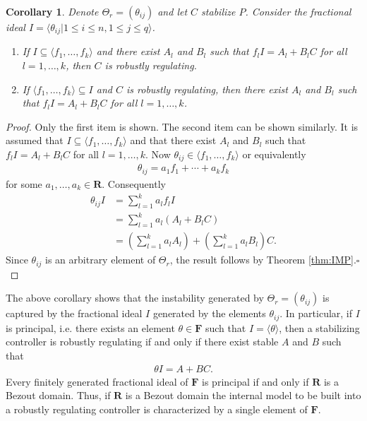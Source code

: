 \documentclass[11pt, a4paper]{amsart}
\newtheorem{corollary}[theorem]{Corollary}
\newcommand{\Plant}{P}										%
\newcommand{\Cont}{C}										%
\newcommand{\Gen}{\Theta}									%
\newcommand{\gen}{\theta}									%
\newcommand{\stable}{\mathbf{R}}							%
\newcommand{\fractions}[1]{\mathbf{F}} %
\begin{document}
\begin{corollary}\label{cor:IMP2}
Denote $\Gen_r=(\gen_{ij})$ and let $\Cont$ stabilize $\Plant$. Consider the fractional ideal $I=\langle \gen_{ij} | 1\leq i\leq n, 1\leq j\leq q\rangle$.
\begin{enumerate}
\item If $I\subseteq \langle f_1,\ldots,f_k\rangle$ and there exist $A_l$ and $B_l$ such that $f_l I=A_l+B_l \Cont$ for all $l=1,\ldots, k$, then $\Cont$ is robustly regulating. 
\item If $\langle f_1,\ldots,f_k\rangle\subseteq I$ and $\Cont$ is robustly regulating, then there exist $A_l$ and $B_l$ such that $f_l I=A_l+B_l \Cont$ for all $l=1,\ldots, k$.
\end{enumerate}
\end{corollary}
\begin{proof}
Only the first item is shown. The second item can be shown similarly. It is assumed that $I\subseteq \langle f_1,\ldots,f_k\rangle$ and that there exist $A_l$ and $B_l$ such that $f_l I=A_l+B_l \Cont$ for all $l=1,\ldots, k$. Now $\gen_{ij}\in \langle f_1,\ldots,f_k\rangle$ or equivalently
\begin{align*}
\gen_{ij}=a_1 f_1+\cdots +a_k f_k
\end{align*}
for some $a_1,\ldots, a_k\in \stable$. Consequently
\begin{align*}
\gen_{ij} I & =\sum_{l=1}^k a_l f_l I\\
& = \sum_{l=1}^k a_l(A_l+B_l \Cont)\\
& =\left(\sum_{l=1}^k a_l A_l\right)+\left(\sum_{l=1}^{k}a_l B_l\right)\Cont.
\end{align*}
Since $\gen_{ij}$ is an arbitrary element of $\Gen_r$, the result follows by Theorem \ref{thm:IMP}.\hfill$\square$
\end{proof}

The above corollary shows that the instability generated by $\Gen_r=(\gen_{ij})$ is captured by the fractional ideal $I$ generated by the elements $\gen_{ij}$. In particular, if $I$ is principal, i.e. there exists an element $\gen\in\fractions{\stable}$ such that $I=\langle\gen\rangle$, then a stabilizing controller is robustly regulating if and only if there exist stable $A$ and $B$ such that
\begin{align*}
\gen I=A+B\Cont.
\end{align*}
Every finitely generated fractional ideal of $\fractions{\stable}$ is principal if and only if $\stable$ is a Bezout domain. Thus, if $\stable$ is a Bezout domain the internal model to be built into a robustly regulating controller is characterized by a single element of $\fractions{\stable}$.
\end{document}
